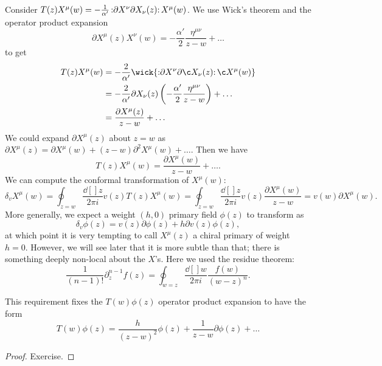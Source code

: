 Consider $ T(z) X^{\mu}(w) = -\frac{1}{\alpha'} \mathop{:}\nolimits\!\partial X^{\nu} \partial X_{\nu} (z)\!\mathop{:}\nolimits X^{\mu}(w)$.
We use Wick's theorem and the operator product expansion
\begin{equation}
  \partial X^{\mu}(z) X^{\nu}(w) = -\frac{\alpha'}{2} \frac{\eta^{\mu\nu}}{z - w} + \dots
\end{equation}
to get
\begin{align}
  T(z) X^{\mu}(w) &= -\frac{2}{\alpha'} \wick{\normalorder{ \partial X^{\nu} \partial \c X_{\nu}(z)} \c X^{\mu}(w)} \\
		  &= -\frac{2}{\alpha'} \partial X_{\nu}(z) \left( -\frac{\alpha'}{2} \frac{\eta^{\mu\nu}}{z - w}  \right) + \dots \\
		  &= \frac{\partial X^{\mu}(z)}{z - w} + \dots
\end{align}
We could expand $\partial X^{\mu}(z)$ about $z = w$ as $\partial X^{\mu}(z) = \partial X^{\mu}(w) + (z-w) \partial^2 X^{\mu}(w) + \dots$.
Then we have
\begin{equation}
  T(z) X^{\mu}(w) = \frac{\partial X^{\mu}(w)}{z - w} + \dots.
\end{equation}
We can compute the conformal transformation of $X^{\mu}(w)$:
\begin{equation}
  \delta_v X^{\mu}(w) = \oint_{z = w} \frac{ \dd[]{z}}{2 \pi i} v(z) T(z) X^{\mu}(w) = \oint_{z = w} \frac{\dd[]{z}}{2 \pi i} v(z) \frac{\partial X^{\mu}(w)}{z - w} = v(w) \partial X^{\mu}(w).
\end{equation}
More generally, we expect a weight $(h, 0)$ primary field $\phi(z)$ to transform as
\begin{equation}
  \delta_v \phi(z) = v(z) \partial \phi(z) + h \partial v (z) \phi(z),
\end{equation}
at which point it is very tempting to call $X^{\mu}(z)$ a chiral primary of weight $h = 0$. However, we will see later that it is more subtle than that; there is something deeply non-local about the $X$'s.
Here we used the residue theorem:
\begin{equation}
  \frac{1}{(n - 1)!} \partial_z^{n-1} f(z) = \oint_{w = z} \frac{\dd[]{w}}{2 \pi i} \frac{f(w)}{(w - z)^n}.
\end{equation}

\begin{claim}
  This requirement fixes the $T(w) \phi(z)$ operator product expansion to have the form
  \begin{equation}
    \label{eq:14-ope}
    \boxed{T(w) \phi(z) = \frac{h}{(z - w)^2} \phi(z) + \frac{1}{z - w} \partial \phi(z) + \dots}
  \end{equation}
\end{claim}
\begin{proof}
  Exercise.
\end{proof}

